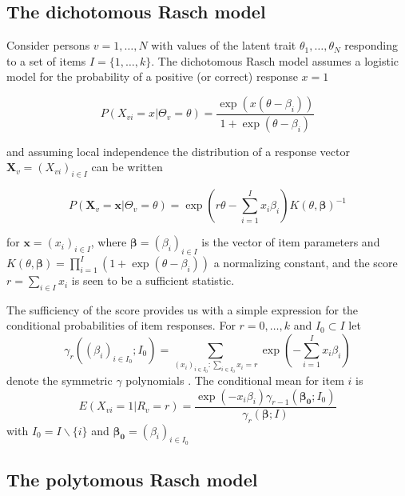 \documentclass{article}
\begin{document}
\subsection{The dichotomous Rasch model}


Consider persons $v=1,\ldots,N$ with values of the latent trait $\theta_1,\ldots,\theta_N$ responding to a set of items $I=\{1,\ldots,k\}$. The dichotomous Rasch model assumes a logistic model for the probability of a positive (or correct) response $x=1$

\begin{equation}
P(X_{vi}=x|\Theta_v=\theta)=\frac{\exp(x(\theta-\beta_i))}{1+\exp(\theta-\beta_i)}
\end{equation}

and assuming local independence \cite{Yen_1984,Christensen-Makransky-Horton} the distribution of a response vector $\boldsymbol{X}_v=(X_{vi})_{i\in I}$ can be written

\begin{equation}
P(\boldsymbol{X}_v=\boldsymbol{x}|\Theta_v=\theta)=
\exp\left(r\theta-\sum_{i=1}^{I}x_i\beta_i\right)K(\theta,\boldsymbol{\beta})^{-1}
\end{equation}

for $\boldsymbol{x}=(x_i)_{i\in I}$, where $\boldsymbol{\beta}=(\beta_i)_{i\in I}$ is the vector of item parameters and $K(\theta,\boldsymbol{\beta})=\prod_{i=1}^{I}\left(1+\exp(\theta-\beta_i)\right)$ a normalizing constant, and the score $r=\sum_{i\in I}x_i$ is seen to be a sufficient statistic.


The sufficiency of the score provides us with a simple expression for the conditional probabilities of item responses. For $r=0,\ldots,k$ and $I_0\subset I$ let
\begin{equation}
\gamma_r((\beta_i)_{i\in I_0};I_0)=\sum_{(x_i)_{i\in I_0}:\sum_{i\in I_0}x_i=r}\exp\left(-\sum_{i=1}^{I}x_i\beta_i\right)
\end{equation}
denote the symmetric $\gamma$ polynomials \cite{Andersen_1995}. The conditional mean for item $i$ is
\begin{equation}
E(X_{vi}=1|R_v=r)=\frac{\exp(-x_i\beta_i)\gamma_{r-1}(\boldsymbol{\beta_0};I_0)}{\gamma_r(\boldsymbol{\beta};I)}
\label{condprob}
\end{equation}
with $I_0=I\backslash\{i\}$ and $\boldsymbol{\beta_0}=(\beta_i)_{i\in I_0}$


\subsection{The polytomous Rasch model}
\end{document}
